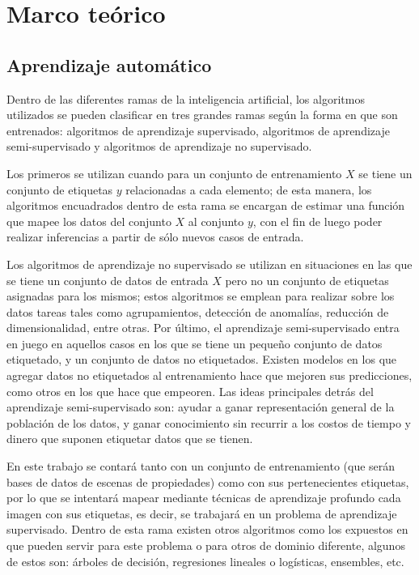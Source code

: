 \section{Marco teórico}
\subsection{Aprendizaje automático}
 Dentro de las diferentes ramas de la inteligencia artificial, los algoritmos utilizados se pueden clasificar en tres grandes ramas según la forma en que son entrenados: algoritmos de aprendizaje supervisado, algoritmos de aprendizaje semi-supervisado y algoritmos de aprendizaje no supervisado.
 
  Los primeros se utilizan cuando para un conjunto de entrenamiento \(X\) se tiene un conjunto de etiquetas \(y\) relacionadas a cada elemento; de esta manera, los algoritmos encuadrados dentro de esta rama se encargan de estimar una función que mapee los datos del conjunto \(X\) al conjunto \(y\), con el fin de luego poder realizar inferencias a partir de sólo nuevos casos de entrada.
 
  Los algoritmos de aprendizaje no supervisado se utilizan en situaciones en las que se tiene un conjunto de datos de entrada \(X\) pero no un conjunto de etiquetas asignadas para los mismos; estos algoritmos se emplean para realizar sobre los datos tareas tales como agrupamientos, detección de anomalías, reducción de dimensionalidad, entre otras.
  Por último, el aprendizaje semi-supervisado entra en juego en aquellos casos en los que se tiene un pequeño conjunto de datos etiquetado, y un conjunto de datos no etiquetados. Existen modelos en los que agregar datos no etiquetados al entrenamiento hace que mejoren sus predicciones, como otros en los que hace que empeoren. Las ideas principales detrás del aprendizaje semi-supervisado son: ayudar a ganar representación general de la población de los datos, y ganar conocimiento sin recurrir a los costos de tiempo y dinero que suponen etiquetar datos que se tienen.
 
 En este trabajo se contará tanto con un conjunto de entrenamiento (que serán bases de datos de escenas de propiedades) como con sus pertenecientes etiquetas, por lo que se intentará mapear mediante técnicas de aprendizaje profundo cada imagen con sus etiquetas, es decir, se trabajará en un problema de aprendizaje supervisado. Dentro de esta rama existen otros algoritmos como los expuestos en \cite{scikit-learn} que pueden servir para este problema o para otros de dominio diferente, algunos de estos son: árboles de decisión, regresiones lineales o logísticas, ensembles, etc.
 
